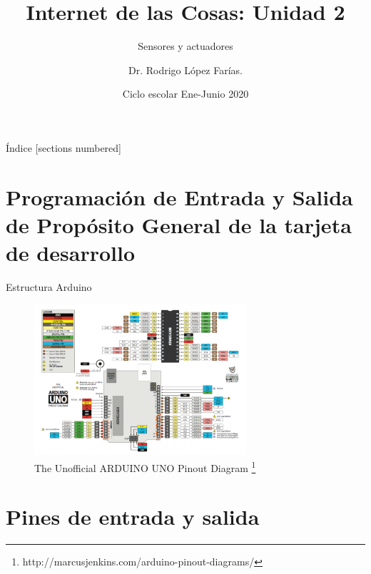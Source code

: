 \documentclass{beamer}
\title{Internet de las Cosas:  Unidad 2}
\subtitle{Sensores y actuadores}
\author{Dr. Rodrigo López Farías. \\}
\institute{Instituto Tecnológico de Querétaro \\ Ingeniería en Sistemas Computacionales}
\date{Ciclo escolar Ene-Junio 2020}
\begin{document}
\frame{\maketitle}


\begin{frame}{Índice}
  [sections numbered]
  \tableofcontents[hideallsubsections]
\end{frame}





\section{Programación de Entrada y Salida de Propósito General de la tarjeta de desarrollo}

\begin{frame}{Estructura Arduino}

\begin{figure}
\centering
\includegraphics[width=0.7\textwidth]{figures/arduinounoref.png}
\caption{The Unofficial ARDUINO UNO Pinout Diagram \footnote{http://marcusjenkins.com/arduino-pinout-diagrams/} }
\end{figure}

\end{frame}


\section{Pines de entrada y salida}
\end{document}
